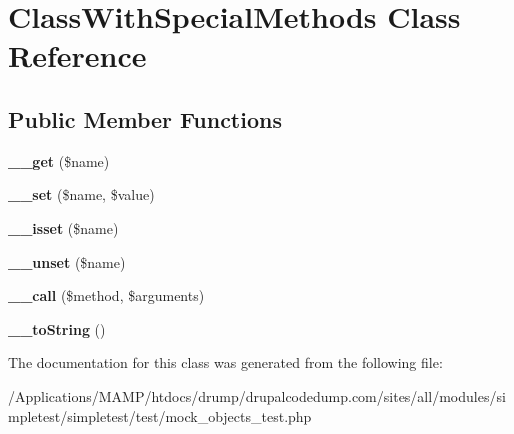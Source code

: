 \hypertarget{class_class_with_special_methods}{
\section{ClassWithSpecialMethods Class Reference}
\label{class_class_with_special_methods}
}
\subsection*{Public Member Functions}
\begin{DoxyCompactItemize}
\item 
\hypertarget{class_class_with_special_methods_ac7e60e6b09188576d05d730efea851d7}{
{\bfseries \_\-\_\-get} (\$name)}
\label{class_class_with_special_methods_ac7e60e6b09188576d05d730efea851d7}

\item 
\hypertarget{class_class_with_special_methods_a78bb7141e17c7b860bdc476067c93d93}{
{\bfseries \_\-\_\-set} (\$name, \$value)}
\label{class_class_with_special_methods_a78bb7141e17c7b860bdc476067c93d93}

\item 
\hypertarget{class_class_with_special_methods_aaf7bb583072661a339b2466ae35f43e3}{
{\bfseries \_\-\_\-isset} (\$name)}
\label{class_class_with_special_methods_aaf7bb583072661a339b2466ae35f43e3}

\item 
\hypertarget{class_class_with_special_methods_af1da6b2a3ff3f35a89f924ed77c5068d}{
{\bfseries \_\-\_\-unset} (\$name)}
\label{class_class_with_special_methods_af1da6b2a3ff3f35a89f924ed77c5068d}

\item 
\hypertarget{class_class_with_special_methods_a2cab93584c646b30c93c8749cb55c692}{
{\bfseries \_\-\_\-call} (\$method, \$arguments)}
\label{class_class_with_special_methods_a2cab93584c646b30c93c8749cb55c692}

\item 
\hypertarget{class_class_with_special_methods_a6940de70ddb137eb7fabcd950d7a6acb}{
{\bfseries \_\-\_\-toString} ()}
\label{class_class_with_special_methods_a6940de70ddb137eb7fabcd950d7a6acb}

\end{DoxyCompactItemize}


The documentation for this class was generated from the following file:\begin{DoxyCompactItemize}
\item 
/Applications/MAMP/htdocs/drump/drupalcodedump.com/sites/all/modules/simpletest/simpletest/test/mock\_\-objects\_\-test.php\end{DoxyCompactItemize}
